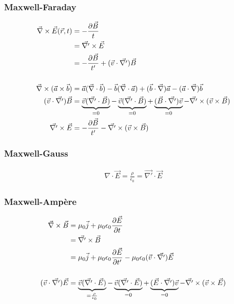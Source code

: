 \subsubsection*{Maxwell-Faraday}
\begin{align*}
	\vec{\nabla}\times\vec{E}(\vec{r},t)&=-\frac{\partial \vec{B}}{t}\\
		&=\vec{\nabla '}\times\vec{E}\\
		&=-\frac{\partial \vec{B}}{t'} + (\vec{v}\cdot\vec{\nabla '})\vec{B}\\[15pt]
	\vec{\nabla}\times(\vec{a}\times\vec{b})&=\vec{a}(\vec{\nabla}\cdot\vec{b})
			-\vec{b}(\vec{\nabla}\cdot\vec{a})
			+(\vec{b}\cdot\vec{\nabla})\vec{a}
			-(\vec{a}\cdot\vec{\nabla})\vec{b}\\
	(\vec{v}\cdot\vec{\nabla '})\vec{B}&=\underbrace{\vec{v}(\vec{\nabla '}\cdot\vec{B})}_{=0}
			-\underbrace{\vec{v}(\vec{\nabla '}\cdot\vec{B})}_{=0}
			+\underbrace{(\vec{B}\cdot\vec{\nabla '})\vec{v}}_{=0}
			-\vec{\nabla '}\times(\vec{v}\times\vec{B})\\
	\vec{\nabla '}\times\vec{E}&=-\frac{\partial \vec{B}}{t'}-\vec{\nabla '}\times(\vec{v}\times\vec{B})
\end{align*}

\subsubsection*{Maxwell-Gauss}
\begin{align*}
{\nabla}\cdot\vec{E}=\boxed{\frac{\rho}{\epsilon_0}=\vec{\nabla '}\cdot\vec{E}}
\end{align*}

\subsubsection*{Maxwell-Ampère}
\begin{align*}
	\vec{\nabla}\times\vec{B}&=\mu_0\vec{j}+\mu_0\epsilon_0\frac{\partial \vec{E}}{\partial t}\\
		&=\vec{\nabla '}\times\vec{B}\\
		&=\mu_0\vec{j}+\mu_0\epsilon_0\frac{\partial \vec{E}}{\partial t'}-\mu_0\epsilon_0(\vec{v}\cdot\vec{\nabla '})\vec{E}\\[15pt]
	(\vec{v}\cdot\vec{\nabla '})\vec{E}&=\underbrace{\vec{v}(\vec{\nabla '}\cdot\vec{E})}_{=\frac{\rho}{\epsilon_0}}
			-\underbrace{\vec{v}(\vec{\nabla '}\cdot\vec{E})}_{=0}
			+\underbrace{(\vec{E}\cdot\vec{\nabla '})\vec{v}}_{=0}
			-\vec{\nabla '}\times(\vec{v}\times\vec{E})
\end{align*}


